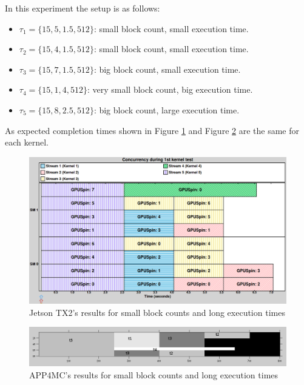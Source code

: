 \documentclass[
  12pt,
  a4paperpaper,
]{report}
\providecommand{\tightlist}{%
  \setlength{\itemsep}{0pt}\setlength{\parskip}{0pt}}
\begin{document}
In this experiment the setup is as follows:

\begin{itemize}
\tightlist
\item
  \(\tau_1 = \{15,5,1.5,512\}\): small block count, small execution
  time.
\item
  \(\tau_2 = \{15,4,1.5,512\}\): small block count, small execution
  time.
\item
  \(\tau_3 = \{15,7,1.5,512\}\): big block count, small execution time.
\item
  \(\tau_4 =\{ 15, 1,4,512\}\): very small block count, big execution
  time.
\item
  \(\tau_5 = \{15,8,2.5,512\}\): big block count, large execution time.
\end{itemize}

As expected completion times shown in Figure \ref{img:nvidia-ex07} and
Figure \ref{img:octave-ex07} are the same for each kernel.

\begin{figure}
\centering
\includegraphics[width=1\textwidth,height=\textheight]{source/figures/nvidia/ex07.png}
\caption{Jetson TX2's results for small block counts and long execution times \label{img:nvidia-ex07}}
\end{figure}

\begin{figure}
\centering
\includegraphics[width=1\textwidth,height=\textheight]{source/figures/octave/ex07.png}
\caption{APP4MC's results for small block counts and long execution times \label{img:octave-ex07}}
\end{figure}
\end{document}
